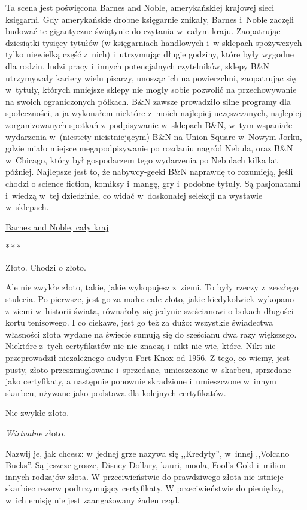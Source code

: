 \documentclass[oneside,polish,11pt,rmheadings]{mwbk}
\newcommand{\threeast}{\par\centerline{*\,*\,*}\medskip\par}
\begin{document}
Ta scena jest poświęcona Barnes and Noble, amerykańskiej krajowej sieci księgarni. Gdy amerykańskie drobne księgarnie znikały, Barnes i~Noble zaczęli budować te gigantyczne świątynie do czytania w~całym kraju. Zaopatrując dziesiątki tysięcy tytułów (w księgarniach handlowych i~w sklepach spożywczych tylko niewielką część z~nich) i~utrzymując długie godziny, które były wygodne dla rodzin, ludzi pracy i~innych potencjalnych czytelników, sklepy B\&N utrzymywały kariery wielu pisarzy, unosząc ich na powierzchni, zaopatrując się w~tytuły, których mniejsze sklepy nie mogły sobie pozwolić na przechowywanie na swoich ograniczonych półkach. B\&N zawsze prowadziło silne programy dla społeczności, a ja wykonałem niektóre z~moich najlepiej uczęszczanych, najlepiej zorganizowanych spotkań z~podpisywanie w~sklepach B\&N, w~tym wspaniałe wydarzenia w~(niestety nieistniejącym) B\&N na Union Square w~Nowym Jorku, gdzie miało miejsce megapodpisywanie po rozdaniu nagród Nebula, oraz B\&N w~Chicago, który był gospodarzem tego wydarzenia po Nebulach kilka lat później. Najlepsze jest to, że nabywcy-geeki B\&N naprawdę to rozumieją, jeśli chodzi o science fiction, komiksy i~mangę, gry i~podobne tytuły. Są pasjonatami i~wiedzą w~tej dziedzinie, co widać w~doskonałej selekcji na wystawie w~sklepach. 


\href{https://www.barnesandnoble.com/b/contributor/cory-doctorow/_/N-2qlt}{Barnes and Noble, cały kraj} 

\bigskip
\threeast

Złoto. Chodzi o złoto. 


Ale nie zwykłe złoto, takie, jakie wykopujesz z~ziemi. To były rzeczy z~zeszłego stulecia. Po pierwsze, jest go za mało: całe złoto, jakie kiedykolwiek wykopano z~ziemi w~historii świata, równałoby się jedynie sześcianowi o bokach długości kortu tenisowego. I co ciekawe, jest go też za dużo: wszystkie świadectwa własności złota wydane na świecie sumują się do sześcianu dwa razy większego. Niektóre z~tych certyfikatów nic nie znaczą i~nikt nie wie, które. Nikt nie przeprowadził niezależnego audytu Fort Knox od 1956. Z tego, co wiemy, jest pusty, złoto przeszmuglowane i~sprzedane, umieszczone w~skarbcu, sprzedane jako certyfikaty, a następnie ponownie skradzione i~umieszczone w~innym skarbcu, używane jako podstawa dla kolejnych certyfikatów. 


Nie zwykłe złoto. 


\textit{Wirtualne} złoto. 


Nazwij je, jak chcesz: w~jednej grze nazywa się ,,Kredyty'', w~innej ,,Volcano Bucks''. Są jeszcze grosze, Disney Dollary, kauri, moola, Fool's Gold i~milion innych rodzajów złota. W przeciwieństwie do prawdziwego złota nie istnieje skarbiec rezerw podtrzymujący certyfikaty. W przeciwieństwie do pieniędzy, w~ich emisję nie jest zaangażowany żaden rząd. 
\end{document}
